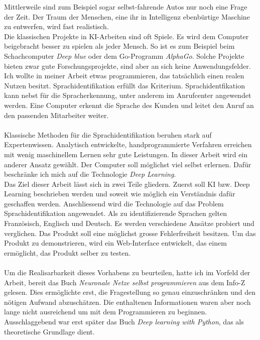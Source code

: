 Mittlerweile sind zum Beispiel sogar selbst-fahrende Autos nur noch eine Frage der Zeit. Der Traum der Menschen, eine ihr in Intelligenz ebenbürtige Maschine zu entwerfen, wird fast realistisch.
\\
Die klassischen Projekte in KI-Arbeiten sind oft Spiele. Es wird dem Computer beigebracht besser zu spielen als jeder Mensch. So ist es zum Beispiel beim Schachcomputer
\textit{Deep blue}\parencite{deepblue} oder dem Go-Programm \textit{AlphaGo}\parencite{alphago}.
Solche Projekte bieten zwar gute Forschungsprojekte, sind aber an sich keine Anwendungsfelder. Ich wollte in meiner Arbeit etwas programmieren, das tatsächlich einen realen Nutzen
besitzt.
Sprachidentifikation erfüllt das Kriterium. Sprachidentfikation kann nebst für die Spracherkennung, unter anderem im Anrufcenter angewendet werden. Eine Computer erkennt die Sprache des Kunden und leitet den Anruf an den passenden Mitarbeiter weiter.
\\ \\
Klassische Methoden für die Sprachidentifikation beruhen stark auf Expertenwissen. Analytisch entwickelte, handprogrammierte Verfahren erreichen mit wenig maschinellem Lernen sehr gute Leistungen. In dieser Arbeit wird ein anderer Ansatz gewählt. Der Computer soll möglichst viel selbst erlernen. Dafür beschränke ich mich auf die Technologie \textit{Deep Learning}. 
\\ 
Das Ziel dieser Arbeit lässt sich in zwei Teile gliedern. Zuerst soll KI bzw. Deep Learning beschrieben werden und soweit wie möglich ein Verständnis dafür geschaffen werden.
Anschliessend wird die Technologie auf das Problem Sprachidentifikation angewendet. Als zu identifizierende Sprachen gelten Französisch, Englisch und Deutsch. Es
werden verschiedene Ansätze probiert und verglichen. Das Produkt soll eine möglichst grosse Fehlerfreiheit besitzen. Um das Produkt zu demonstrieren, wird ein Web-Interface
entwickelt, das einem ermöglicht, das Produkt selber zu testen.
\\ \\
Um die Realisarbarkeit dieses Vorhabens zu beurteilen, hatte ich im Vorfeld der Arbeit, bereit das Buch  \textit{Neuronale Netze selbst programmieren}\parencite{neuronale_netze} aus dem Info-Z gelesen. Dies ermöglichte erst, die Fragestellung so genau einzuschränken und den nötigen Aufwand abzuschätzen. Die enthaltenen Informationen waren aber noch lange nicht ausreichend um mit dem Programmieren zu beginnen. Ausschlaggebend war erst später das Buch \textit{Deep learning with Python}\parencite{chollet}, das als theoretische Grundlage dient. 
